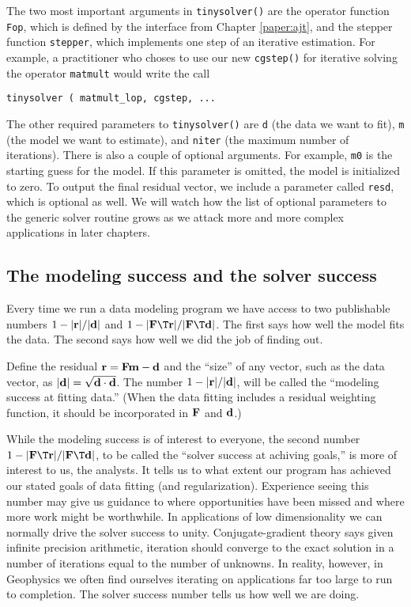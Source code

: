 \par
The two most important arguments in \texttt{tinysolver()}
are the operator function \texttt{Fop},
which is defined by the interface from Chapter \ref{paper:ajt},
and the stepper function \texttt{stepper},
which implements one step of an iterative estimation.
For example, a practitioner who choses to use our new
\texttt{cgstep()} 
for iterative solving the operator
\texttt{matmult} 
would write the call
\par
\texttt{tinysolver ( matmult\_lop, cgstep, ...}
\par
The other required parameters to \texttt{tinysolver()} 
are \texttt{d} (the data we want to fit),
\texttt{m} (the model we want to estimate),
and \texttt{niter} (the maximum number of iterations).
There is also a couple of optional arguments.
For example, \texttt{m0} is the starting guess for the model.
If this parameter is omitted, the model is initialized to zero.
To output the final residual vector,
we include a parameter called \texttt{resd},
which is optional as well.
We will watch how the list of optional parameters
to the generic solver routine grows
as we attack more and more complex applications in later chapters.

\subsection{The modeling success and the solver success}
Every time we run a data modeling program
we have access to two publishable numbers
$1-|\bold r|/|\bold d|$ and
$1-|\bold F\T\bold r|/|\bold F\T\bold d|$.
The first says how well the model fits the data.
The second says how well we did the job of finding out.

\par
Define the residual $\bold r=\bold F\bold m-\bold d$ and
the ``size'' of any vector, such as the data vector,
as $|\bold d|=\sqrt{\bold d \cdot \bold d}$.
The number $1-|\bold r|/|\bold d|$, will be called the
``modeling success at fitting data.''
(When the data fitting includes a residual weighting function,
it should be incorporated in $\bold F$ and $\bold d$.)

\par
While the modeling success is of interest to everyone, the second number
$1-|\bold F\T\bold r|/|\bold F\T\bold d|$,
to be called the ``solver success at achiving goals,''
is more of interest to us, the analysts.
It tells us to what extent our program
has achieved our stated goals
of data fitting (and regularization).
Experience seeing this number may give us guidance
to where opportunities have been missed
and where more work might be worthwhile.
In applications of low dimensionality
we can normally drive the solver success to unity.
Conjugate-gradient theory says given infinite precision arithmetic,
iteration should converge to the exact solution in a number of
iterations equal to the number of unknowns.
In reality, however,
in Geophysics we often find ourselves iterating on applications
far too large to run to completion.
The solver success number tells us how well we are doing.
\par

